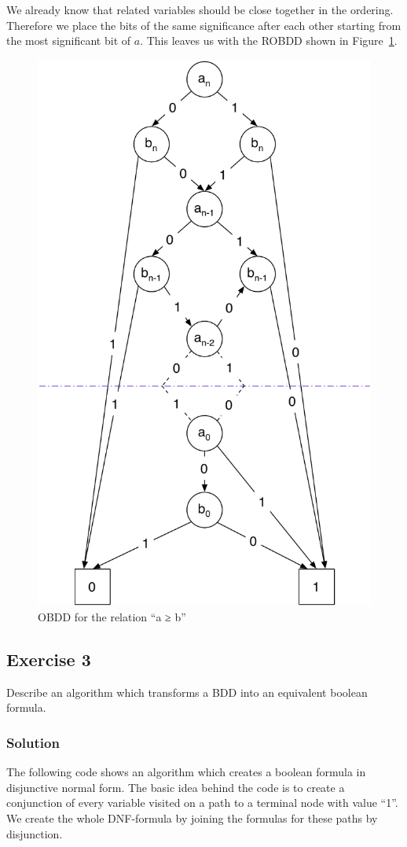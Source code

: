 \documentclass[a4paper, 12pt]{article}
\begin{document}
We already know that related variables should be close together in the
ordering. Therefore we place the bits of the same significance after each
other starting from the most significant bit of $a$. This leaves us with the
ROBDD shown in Figure~\ref{figure:OBDD_Comparison}.

\begin{figure}[htbp]
    \centering
        \includegraphics[width=.62\textwidth]{Figures/OBDD Comparison.pdf}
    \caption{OBDD for the relation “a ≥ b”}
    \label{figure:OBDD_Comparison}
\end{figure}

\subsection{Exercise 3}

Describe an algorithm which transforms a BDD into an equivalent boolean
formula.

\subsubsection{Solution}

The following code shows an algorithm which creates a boolean formula in
disjunctive normal form. The basic idea behind the code is to create a
conjunction of every variable visited on a path to a terminal node with value
“1”. We create the whole DNF-formula by joining the formulas for these paths
by disjunction.
\end{document}
